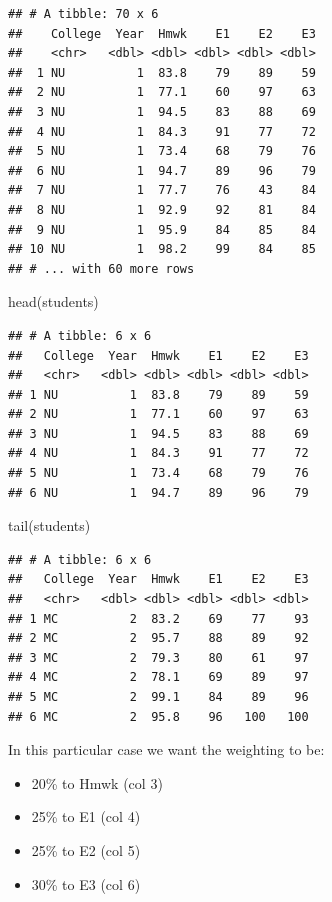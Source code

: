 \documentclass[
]{book}
\newenvironment{Shaded}{\begin{snugshade}}{\end{snugshade}}
\newcommand{\FunctionTok}[1]{\textcolor[rgb]{0.00,0.00,0.00}{#1}}
\newcommand{\NormalTok}[1]{#1}
\providecommand{\tightlist}{%
  \setlength{\itemsep}{0pt}\setlength{\parskip}{0pt}}
\begin{document}
\begin{verbatim}
## # A tibble: 70 x 6
##    College  Year  Hmwk    E1    E2    E3
##    <chr>   <dbl> <dbl> <dbl> <dbl> <dbl>
##  1 NU          1  83.8    79    89    59
##  2 NU          1  77.1    60    97    63
##  3 NU          1  94.5    83    88    69
##  4 NU          1  84.3    91    77    72
##  5 NU          1  73.4    68    79    76
##  6 NU          1  94.7    89    96    79
##  7 NU          1  77.7    76    43    84
##  8 NU          1  92.9    92    81    84
##  9 NU          1  95.9    84    85    84
## 10 NU          1  98.2    99    84    85
## # ... with 60 more rows
\end{verbatim}

\begin{Shaded}
\begin{Highlighting}[]
\FunctionTok{head}\NormalTok{(students)}
\end{Highlighting}
\end{Shaded}

\begin{verbatim}
## # A tibble: 6 x 6
##   College  Year  Hmwk    E1    E2    E3
##   <chr>   <dbl> <dbl> <dbl> <dbl> <dbl>
## 1 NU          1  83.8    79    89    59
## 2 NU          1  77.1    60    97    63
## 3 NU          1  94.5    83    88    69
## 4 NU          1  84.3    91    77    72
## 5 NU          1  73.4    68    79    76
## 6 NU          1  94.7    89    96    79
\end{verbatim}

\begin{Shaded}
\begin{Highlighting}[]
\FunctionTok{tail}\NormalTok{(students)}
\end{Highlighting}
\end{Shaded}

\begin{verbatim}
## # A tibble: 6 x 6
##   College  Year  Hmwk    E1    E2    E3
##   <chr>   <dbl> <dbl> <dbl> <dbl> <dbl>
## 1 MC          2  83.2    69    77    93
## 2 MC          2  95.7    88    89    92
## 3 MC          2  79.3    80    61    97
## 4 MC          2  78.1    69    89    97
## 5 MC          2  99.1    84    89    96
## 6 MC          2  95.8    96   100   100
\end{verbatim}

In this particular case we want the weighting to be:

\begin{itemize}
\tightlist
\item
  20\% to Hmwk (col 3)
\item
  25\% to E1 (col 4)
\item
  25\% to E2 (col 5)
\item
  30\% to E3 (col 6)
\end{itemize}
\end{document}
